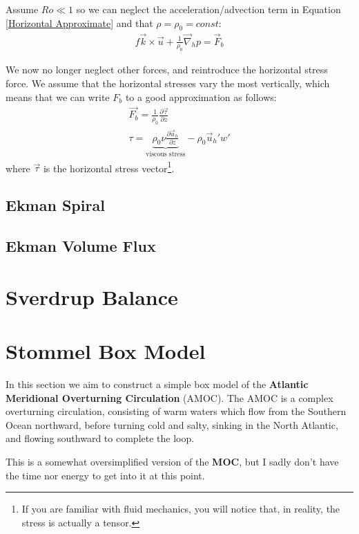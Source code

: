 Assume $Ro\ll1$ so we can neglect the acceleration/advection term in Equation \ref{Horizontal Approximate} and that $\rho=\rho_0=const$:
\begin{align*}
    f\vec{k}\times\vec{u}+\frac{1}{\rho_0}\vec{\nabla}_h p = \vec{F}_b
\end{align*}

We now no longer neglect other forces, and reintroduce the horizontal stress force. We assume that the horizontal stresses vary the most vertically, which means that we can write $F_b$ to a good approximation as follows:
\begin{align*}
    \vec{F_b} = \frac{1}{\rho_0}\frac{\partial \vec{\tau}}{\partial z}\\
    \tau=\underbrace{\rho_0\nu\frac{\partial \vec{u}_h}{\partial z}}_{\text{viscous stress}}-
    \rho_0 \vec{u}_h'w'
\end{align*}
where $\vec{\tau}$ is the horizontal stress vector\footnote{If you are familiar with fluid mechanics, you will notice that, in reality, the stress is actually a tensor.}. 

\subsection{Ekman Spiral}

\subsection{Ekman Volume Flux}

\section{Sverdrup Balance}\label{Sverdrup Balance}

\section{Stommel Box Model}\label{MOC}

In this section we aim to construct a simple box model of the \textbf{Atlantic Meridional Overturning Circulation} (AMOC). The AMOC is a complex overturning circulation, consisting of warm waters which flow from the Southern Ocean northward, before turning cold and salty, sinking in the North Atlantic, and flowing southward to complete the loop.

This is a somewhat oversimplified version of the \textbf{MOC}, but I sadly don't have the time nor energy to get into it at this point. 

